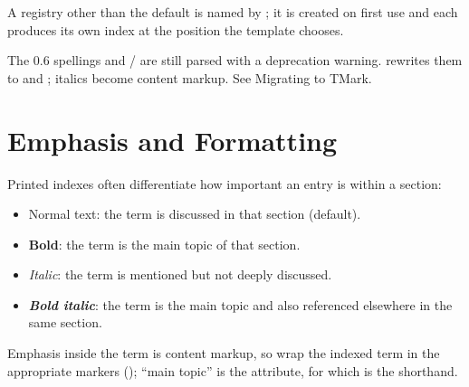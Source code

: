 \documentclass[a4paper,twoside]{article}
\begin{document}
A registry other than the default is named by ; it is created on
first use and each produces its own index at the position the template chooses.
\begin{tscallout}[kind=note, title={\tscodeinline{\{index:reg\}} and the \tscodeinline{\{b\}} / \tscodeinline{\{i\}} suffixes are deprecated}]
The 0.6 spellings  and  /  are
still parsed with a deprecation warning.  rewrites them to
 and ; italics become content
markup. See Migrating to TMark.
\end{tscallout}
\section{Emphasis and Formatting}
Printed indexes often differentiate how important an entry is within a section:
\begin{itemize}
\item Normal text: the term is discussed in that section (default).
\item \textbf{Bold}: the term is the main topic of that section.
\item \emph{Italic}: the term is mentioned but not deeply discussed.
\item \emph{\textbf{Bold italic}}: the term is the main topic and also referenced elsewhere in the same section.
\end{itemize}
Emphasis inside the term is content markup, so wrap the indexed term in the
appropriate markers (\tscodeinline{\#[*topic*]}); \enquote{main topic} is the  attribute,
for which \tscodeinline{\#[**topic**]} is the shorthand.
\end{document}
